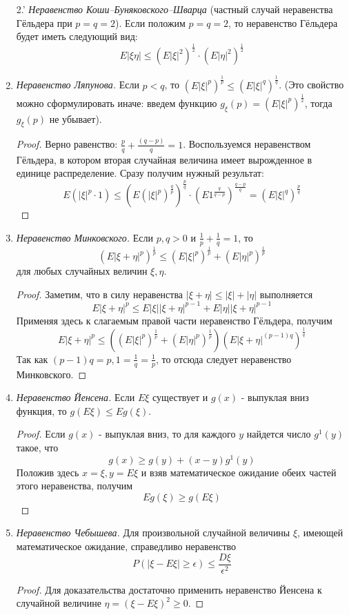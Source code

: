 \begin{enumerate}
\begin{proof}
		\[ \frac{E |\xi \eta|}{(E |\xi|^r)^{\frac{1}{r}} (E |\eta|^s)^{\frac{1}{s}}} \le \frac{\cancel{E |\xi|^r}}{r \cancel{E |\xi|^r}} + \frac{\cancel{E |\eta|^s}}{s \cancel{E |\eta|^s}} \]
		\[ \Rightarrow E |\xi \eta| \le (E |\xi|^r)^{\frac{1}{r}} (E |\xi|^s)^{\frac{1}{s}} \]
	\end{proof}
	\item[2.'] \textit{Неравенство Коши–Буняковского–Шварца} (частный случай неравенства Гёльдера при $p=q=2$). Если положим $p = q = 2$, то неравенство Гёльдера будет иметь следующий вид:
	\[ E |\xi \eta| \le ( E |\xi|^2 )^{\frac{1}{2}} \cdot ( E |\eta|^2 )^{\frac{1}{2}} \]
	\item \textit{Неравенство Ляпунова.} Если $p < q$, то $(E |\xi|^p)^{\frac{1}{p}} \le (E |\xi|^q)^{\frac{1}{q}}$. (Это свойство можно сформулировать иначе: введем функцию $g_{\xi}(p) = (E |\xi|^p)^{\frac{1}{2}}$, тогда $g_{\xi}(p)$ не убывает).
	\begin{proof}
		Верно равенство: $\frac{p}{q} + \frac{(q-p)}{q} = 1$. Воспользуемся неравенством Гёльдера, в котором вторая случайная величина имеет вырожденное в единице распределение. Сразу получим нужный результат:
		\[ E(|\xi|^p \cdot 1) \le (E(|\xi|^p)^{\frac{q}{p}})^{\frac{p}{q}} \cdot (E1^{\frac{q}{q-p}})^{\frac{q-p}{q}} = (E|\xi|^q)^{\frac{p}{q}} \]
	\end{proof}
	\item \textit{Неравенство Минковского.} Если $p, q > 0$ и $\frac{1}{p} + \frac{1}{q} = 1$, то
	\[ ( E |\xi + \eta|^p )^{\frac{1}{p}} \le ( E |\xi|^p )^{\frac{1}{p}} + ( E |\eta|^p )^{\frac{1}{p}} \]
	для любых случайных величин $\xi, \eta$.
	\begin{proof}
		Заметим, что в силу неравенства $|\xi + \eta| \le |\xi| + |\eta|$ выполняется
		\[ E |\xi + \eta|^p \le E |\xi| |\xi + \eta|^{p-1} + E |\eta| |\xi + \eta|^{p-1} \]
		Применяя здесь к слагаемым правой части неравенство Гёльдера, получим
		\[ E |\xi + \eta|^p \le ( ( E |\xi|^p )^{\frac{1}{p}} + ( E |\eta|^p )^{\frac{1}{p}} ) ( E |\xi + \eta|^{(p-1)q} )^{\frac{1}{q}} \]
		Так как $(p-1)q=p, 1=\frac{1}{q}=\frac{1}{p}$, то отсюда следует неравенство Минковского.
	\end{proof}
	\item \textit{Неравенство Йенсена.} Если $E\xi$ существует и $g(x)$ - выпуклая вниз функция, то $g(E\xi) \le E g(\xi)$.
	\begin{proof}
		Если $g(x)$ - выпуклая вниз, то для каждого $y$ найдется число $g^1(y)$ такое, что
		\[ g(x) \ge g(y) + (x-y)g^1(y) \]
		Положив здесь $x=\xi, y = E\xi$ и взяв математическое ожидание обеих частей этого неравенства, получим
		\[ Eg(\xi) \ge g(E\xi) \]
	\end{proof}
	\item \textit{Неравенство Чебышева.} Для произвольной случайной величины $\xi$, имеющей математическое ожидание, справедливо неравенство
	\[ P( |\xi - E\xi| \ge \epsilon ) \le \frac{D\xi}{\epsilon^2} \]
	\begin{proof}
		Для доказательства достаточно применить неравенство Йенсена к случайной величине $\eta = (\xi - E\xi)^2 \ge 0$.
	\end{proof}
\end{enumerate}
